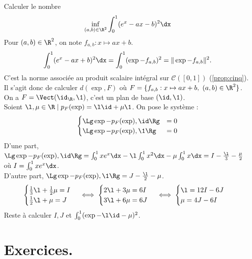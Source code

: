 \documentclass[11pt]{article}
\renewcommand*{\C}{\mathcal{C}}
\begin{document}
\begin{ex}{}{}
    Calculer le nombre
    \begin{equation*}
        \inf_{(a,b)\in \R^2}\int_0^1(e^x-ax-b)^2\dx
    \end{equation*}
    \tcblower
    Pour $(a,b)\in\R^2$, on note $f_{a,b}:x\mapsto ax + b$.
    \begin{equation*}
        \int_0^1(e^x-ax+b)^2\dx=\int_0^1(\exp - f_{a,b})^2=\|\exp - f_{a,b}\|^2.
    \end{equation*}    
    C'est la norme associée au produit scalaire intégral sur $\C([0,1])$ (\ref{prop:cinq}).\\
    Il s'agit donc de calculer $d(\exp, F)$ où $F=\{f_{a,b}:x\mapsto ax+b, ~ (a,b)\in\R^2\}$.\\
    On a $F=\Vect(\id_\R, \1)$, c'est un plan de base $(\id,\1)$.\\
    Soient $\l,\mu\in\R\mid p_F(\exp)=\l \id + \mu\1$. On pose le système :
    \begin{equation*}
        \begin{cases}
            \Lg \exp-p_F(\exp), \id\Rg &= 0\\
            \Lg \exp-p_F(\exp), \1\Rg &= 0
        \end{cases}
    \end{equation*}
    D'une part, $\Lg \exp - p_F(\exp), \id\Rg = \int_0^1xe^x\dx - \l\int_0^1x^2\dx - \mu \int_0^1 x\dx= I - \frac{\l}{3}-\frac{\mu}{2}$ où $I=\int_0^1xe^x\dx$.\\
    D'autre part, $\Lg \exp - p_F(\exp),\1\Rg = J - \frac{\l}{2}-\mu$.
    \begin{equation*}
        \begin{cases}
            \frac{1}{3}\l + \frac{1}{2}\mu = I\\
            \frac{1}{2}\l + \mu = J
        \end{cases}
        \iff 
        \begin{cases}
            2\l + 3\mu = 6I\\
            3\l + 6\mu = 6J
        \end{cases}
        \iff
        \begin{cases}
            \l = 12I - 6J\\
            \mu = 4J - 6I
        \end{cases}
    \end{equation*}
    Reste à calculer $I,J$ et $\int_0^1(\exp-\l\id - \mu)^2$.
\end{ex}
\section{Exercices.}
\end{document}

